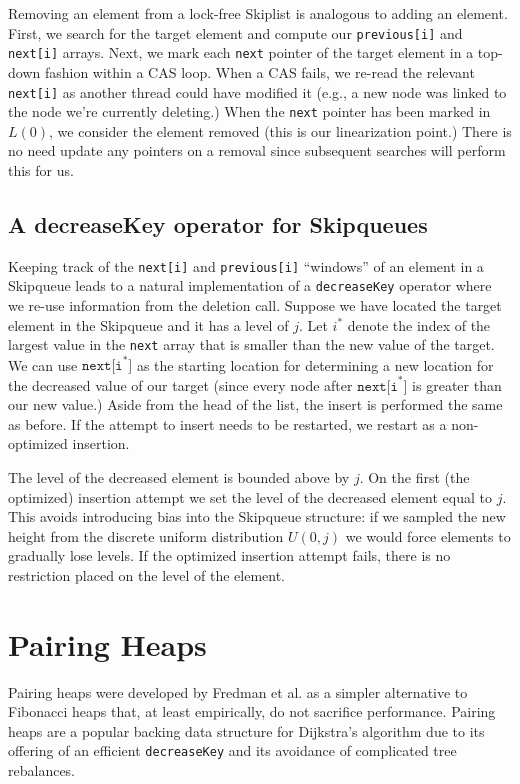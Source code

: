 \documentclass{acm_proc_article-sp}
\begin{document}
Removing an element from a lock-free Skiplist is analogous to adding an element.
First, we search for the target element and compute our \texttt{previous[i]} and \texttt{next[i]}
arrays. Next, we mark each
\texttt{next} pointer of the target element in a top-down fashion within a CAS loop. When a CAS fails,
we re-read the relevant \texttt{next[i]} as another thread could have modified it (e.g., a
new node was linked to the node we're currently deleting.) When the \texttt{next}
pointer has been marked in $L(0)$, we consider the element removed (this is our linearization
point.) There is no need update any pointers on a removal since subsequent searches will perform
this for us.

\subsection{A decreaseKey operator for Skipqueues}
\label{skipqueue:decreasekey}
Keeping track of the \texttt{next[i]} and \texttt{previous[i]}
``windows'' of an element in a Skipqueue leads to a natural implementation
of a \texttt{decreaseKey} operator where we re-use information from
the deletion call. Suppose we have located the target element in the
Skipqueue and it has a level of $j$. Let $i^*$ denote the index of the largest value
in the \texttt{next} array that is smaller than the new value of the target. We can use
$\mathtt{next[i}^*\mathtt{]}$ as the starting location for determining a new location
for the decreased value of our target (since every node after $\mathtt{next[i}^*\mathtt{]}$
is greater than our new value.) Aside from the head of the list, the insert is performed
the same as before. If the attempt to insert needs to be restarted, we restart as a non-optimized insertion.

The level of the decreased element is bounded above by $j$. On the first (the optimized) insertion attempt we
set the level of the decreased element equal to $j$. This avoids introducing bias into the Skipqueue structure: if we sampled
the new height from the discrete uniform distribution $U(0, j)$ we would force elements to gradually
lose levels. If the optimized insertion attempt fails, there is no restriction placed on the level of the element.

\section{Pairing Heaps}
Pairing heaps were developed by Fredman et al. \cite{fredman86} as
a simpler alternative to Fibonacci heaps that, at least empirically,
do not sacrifice performance.
Pairing heaps are a popular backing data structure
for Dijkstra's algorithm due to its offering of an efficient
\texttt{decreaseKey} and its avoidance of complicated tree rebalances.
\end{document}
